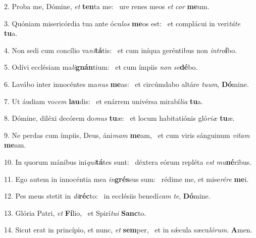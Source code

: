 2. Proba me, Dómine, \textit{et} \textbf{ten}ta me: \ast\  ure renes meos \textit{et} \textit{cor} \textbf{me}um.\

3. Quóniam misericórdia tua ante ócu\textit{los} \textbf{me}os est: \ast\  et complácui in veri\textit{tá}\textit{te} \textbf{tu}a.\

4. Non sedi cum concílio va\textit{ni}\textbf{tá}tis: \ast\  et cum iníqua geréntibus non \textit{in}\textit{tro}\textbf{í}bo.\

5. Odívi ecclésiam ma\textit{li}\textbf{gnán}tium: \ast\  et cum ímpiis \textit{non} \textit{se}\textbf{dé}bo.\

6. Lavábo inter innocéntes ma\textit{nus} \textbf{me}as: \ast\  et circúmdabo altáre \textit{tu}\textit{um}, \textbf{Dó}mine.\

7. Ut áudiam vo\textit{cem} \textbf{lau}dis: \ast\  et enárrem univérsa mirabí\textit{li}\textit{a} \textbf{tu}a.\

8. Dómine, diléxi decórem do\textit{mus} \textbf{tu}æ: \ast\  et locum habitatiónis gló\textit{ri}\textit{æ} \textbf{tu}æ.\

9. Ne perdas cum ímpiis, Deus, áni\textit{mam} \textbf{me}am, \ast\  et cum viris sánguinum \textit{vi}\textit{tam} \textbf{me}am.\

10. In quorum mánibus ini\textit{qui}\textbf{tá}tes sunt: \ast\  déxtera eórum repléta \textit{est} \textit{mu}\textbf{né}ribus.\

11. Ego autem in innocéntia mea \textit{in}\textbf{grés}sus sum: \ast\  rédime me, et mise\textit{ré}\textit{re} \textbf{me}i.\

12. Pes meus stetit in \textit{di}\textbf{réc}to: \ast\  in ecclésiis benedí\textit{cam} \textit{te}, \textbf{Dó}mine.\

13. Glória Patri, \textit{et} \textbf{Fí}lio, \ast\  et Spirí\textit{tu}\textit{i} \textbf{Sanc}to.\

14. Sicut erat in princípio, et nunc, \textit{et} \textbf{sem}per, \ast\  et in sǽcula sæcu\textit{ló}\textit{rum}. \textbf{A}men.\

